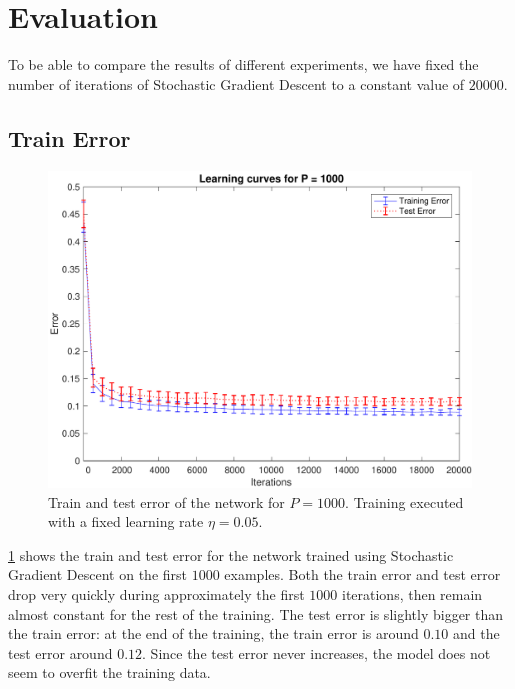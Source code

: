 \section{Evaluation}
\label{sec:evaluation}

To be able to compare the results of different experiments, we have fixed the number of iterations of Stochastic Gradient Descent to a constant value of $20000$.

\subsection{Train Error}
\begin{figure}[t]
	\centering
	\includegraphics[width=\columnwidth]{figures/error}
	\caption{Train and test error of the network for $P = 1000$. Training executed with a fixed
	learning rate $\eta = 0.05$.}
	\label{fig:training_error}
\end{figure}

\cref{fig:training_error} shows the train and test error for the network trained using Stochastic Gradient Descent on the first $1000$ examples.
Both the train error and test error drop very quickly during approximately the first $1000$ iterations, then remain almost constant for the rest of the training.
The test error is slightly bigger than the train error:
at the end of the training, the train error is around $0.10$ and the test error around $0.12$.
Since the test error never increases, the model does not seem to overfit the training data.

